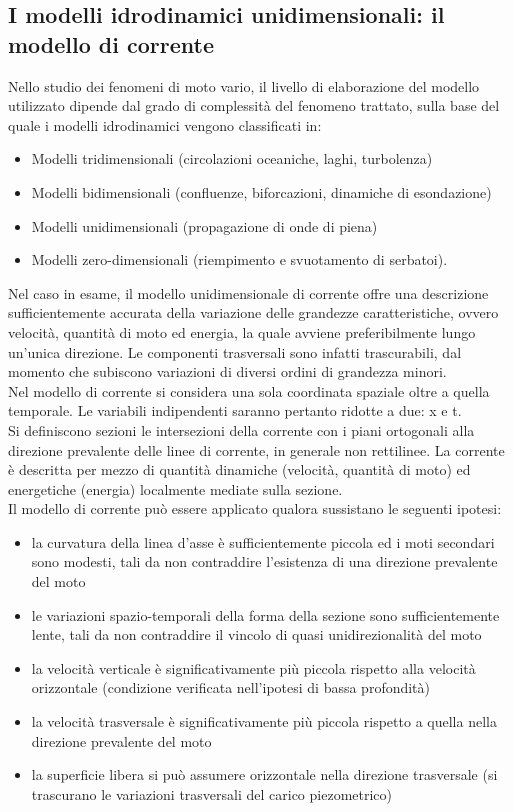\documentclass[12pt]{article} %
\begin{document}
\subsection{I modelli idrodinamici unidimensionali: il modello di corrente}
\noindent 
Nello studio dei fenomeni di moto vario, il livello di elaborazione del modello utilizzato dipende dal grado di complessità del fenomeno trattato, sulla base del quale i modelli idrodinamici vengono classificati in:
\begin{itemize}
    \item Modelli tridimensionali (circolazioni oceaniche, laghi, turbolenza)
    \item Modelli bidimensionali (confluenze, biforcazioni, dinamiche di esondazione)
    \item Modelli unidimensionali (propagazione di onde di piena)
    \item Modelli zero-dimensionali (riempimento e svuotamento di serbatoi).
\end{itemize}
\noindent Nel caso in esame, il modello unidimensionale di corrente offre una descrizione sufficientemente accurata della variazione delle grandezze caratteristiche, ovvero velocità, quantità di moto ed energia, la quale avviene preferibilmente lungo un’unica direzione. Le componenti trasversali sono infatti trascurabili, dal momento che subiscono variazioni di diversi ordini di grandezza minori.
\\
Nel modello di corrente si considera una sola coordinata spaziale oltre a quella temporale. Le variabili indipendenti saranno pertanto ridotte a due: x e t.
\\
Si definiscono sezioni le intersezioni della corrente con i piani ortogonali alla direzione prevalente delle linee di corrente, in generale non rettilinee. La corrente è descritta per mezzo di quantità dinamiche (velocità, quantità di moto) ed energetiche (energia) localmente mediate sulla sezione. \\
Il modello di corrente può essere applicato qualora sussistano le seguenti ipotesi:
\begin{itemize}
    \item la curvatura della linea d’asse è sufficientemente piccola ed i moti secondari sono modesti, tali da non contraddire l’esistenza di una direzione prevalente del moto
    \item le variazioni spazio-temporali della forma della sezione sono sufficientemente lente, tali da non contraddire il vincolo di quasi unidirezionalità del moto
    \item la velocità verticale è significativamente più piccola rispetto alla velocità orizzontale (condizione verificata nell’ipotesi di bassa profondità)
    \item la velocità trasversale è significativamente più piccola rispetto a quella nella direzione prevalente del moto
    \item la superficie libera si può assumere orizzontale nella direzione trasversale (si trascurano le variazioni trasversali del carico piezometrico)
\end{itemize}
\end{document}
